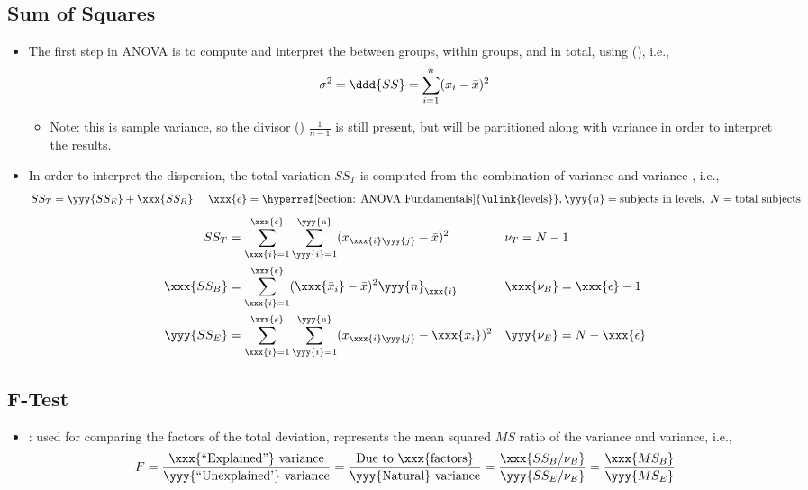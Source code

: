 \begin{itemize}
  \subsection{Sum of Squares}
  \begin{itemize}
    \item The first step in ANOVA is to compute and interpret the \hyperref[Subsection: Measures of Dispersion]{} between groups, within groups, and in total, using \hyperref[Subsection: Measures of Dispersion]{} (), i.e.,
    \[%
    \sigma^2 = \ddd{SS} = \sum_{i = 1}^{n}(x_i-\bar{x})^2
    \]%
    \begin{itemize}
      \item Note: this is sample variance, so the divisor (\hyperref[Subsection: Degrees of Freedom]{}) \(\frac{1}{n-1}\) is still present, but will be partitioned along with variance in order to interpret the results. 
    \end{itemize}
    \item In order to interpret the dispersion, the total variation \(SS_T\) is computed from the combination of  variance  and  variance , i.e.,
    \[%
    SS_{T} = \yyy{SS_{E}} + \xxx{SS_{B}} \quad ~\xxx{\epsilon}=\text{\hyperref[Section: ANOVA Fundamentals]{\ulink{levels}}}, \yyy{n}=\text{subjects in levels},~N=\text{total subjects}
    \]%
    \begin{align*}
      SS_T &= \sum_{\xxx{i} = 1}^{\xxx{\epsilon}}\sum_{\yyy{i} = 1}^{\text{\yyy{n}}}(x_{\xxx{i}\yyy{j}}-\bar{x})^2  &&
      \nu_T = N - 1\\
      \xxx{SS_B} &= \sum_{\xxx{i} = 1}^{\xxx{\epsilon}}(\xxx{\bar{x}_i} - \bar{x})^2 \yyy{n}_\xxx{i} &&
      \xxx{\nu_B} = \xxx{\epsilon} - 1 \\
      \yyy{SS_E} &= \sum_{\xxx{i} = 1}^{\xxx{\epsilon}}\sum_{\yyy{i} = 1}^{\text{\yyy{n}}}(x_{\xxx{i}\yyy{j}}-\xxx{\bar{x}_i})^2  &&
      \yyy{\nu_E} = N-\xxx{\epsilon}
    \end{align*}
  \end{itemize}

  \subsection{F-Test}
  \begin{itemize}
    \item {}: used for comparing the factors of the total deviation, represents the mean squared \(MS\) ratio of the  variance and  variance, i.e.,
    \[%
    F = \frac{\text{\xxx{``Explained''} variance}}{\text{\yyy{``Unexplained'} variance}} = \frac{\text{Due to \xxx{factors}}}{\text{\yyy{Natural} variance}} = \frac{\xxx{SS_B/\nu_B}} {\yyy{SS_E / \nu_E}}= \frac{\xxx{MS_B}}{\yyy{MS_E}}
    \]%
    

\end{itemize}
\end{itemize}
